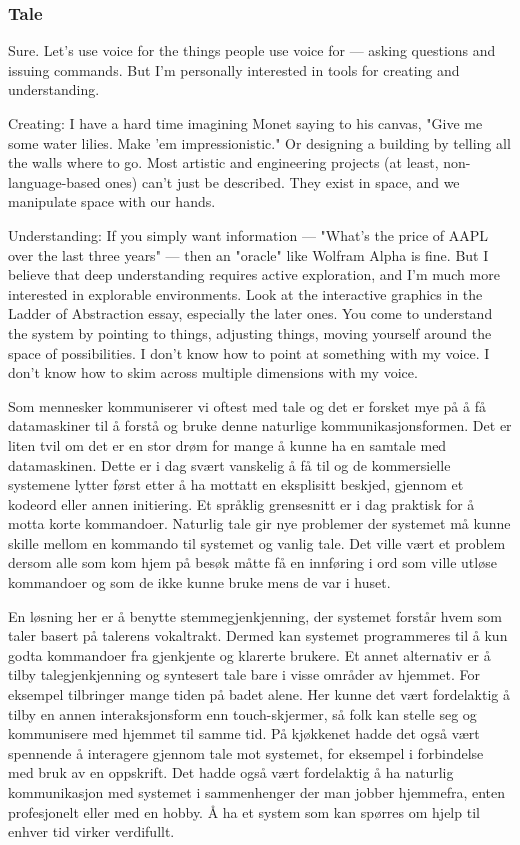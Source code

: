 \subsubsection*{Tale}
{\color{blue}
Sure. Let's use voice for the things people use voice for — asking questions and issuing commands. But I'm personally interested in tools for creating and understanding.

Creating: I have a hard time imagining Monet saying to his canvas, "Give me some water lilies. Make 'em impressionistic." Or designing a building by telling all the walls where to go. Most artistic and engineering projects (at least, non-language-based ones) can't just be described. They exist in space, and we manipulate space with our hands.

Understanding: If you simply want information — "What's the price of AAPL over the last three years" — then an "oracle" like Wolfram Alpha is fine. But I believe that deep understanding requires active exploration, and I'm much more interested in explorable environments. Look at the interactive graphics in the Ladder of Abstraction essay, especially the later ones. You come to understand the system by pointing to things, adjusting things, moving yourself around the space of possibilities. I don't know how to point at something with my voice. I don't know how to skim across multiple dimensions with my voice.

Som mennesker kommuniserer vi oftest med tale og det er forsket mye på å få datamaskiner til å forstå og bruke denne naturlige kommunikasjonsformen. Det er liten tvil om det er en stor drøm for mange å kunne ha en samtale med datamaskinen. Dette er i dag svært vanskelig å få til og de kommersielle systemene lytter først etter å ha mottatt en eksplisitt beskjed, gjennom et kodeord eller annen initiering. Et språklig grensesnitt er i dag praktisk for å motta korte kommandoer. Naturlig tale gir nye problemer der systemet må kunne skille mellom en kommando til systemet og vanlig tale. Det ville vært et problem dersom alle som kom hjem på besøk måtte få en innføring i ord som ville utløse kommandoer og som de ikke kunne bruke mens de var i huset.

En løsning her er å benytte stemmegjenkjenning, der systemet forstår hvem som taler basert på talerens vokaltrakt. Dermed kan systemet programmeres til å kun godta kommandoer fra gjenkjente og klarerte brukere. Et annet alternativ er å tilby talegjenkjenning og syntesert tale bare i visse områder av hjemmet. For eksempel tilbringer mange tiden på badet alene. Her kunne det vært fordelaktig å tilby en annen interaksjonsform enn touch-skjermer, så folk kan stelle seg og kommunisere med hjemmet til samme tid. På kjøkkenet hadde det også vært spennende å interagere gjennom tale mot systemet, for eksempel i forbindelse med bruk av en oppskrift. Det hadde også vært fordelaktig å ha naturlig kommunikasjon med systemet i sammenhenger der man jobber hjemmefra, enten profesjonelt eller med en hobby. Å ha et system som kan spørres om hjelp til enhver tid virker verdifullt.

}
